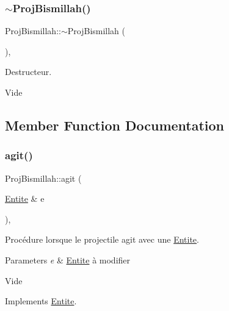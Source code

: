 \subsubsection{\texorpdfstring{$\sim$\+Proj\+Bismillah()}{~ProjBismillah()}}
{\footnotesize\ttfamily Proj\+Bismillah\+::$\sim$\+Proj\+Bismillah (\begin{DoxyParamCaption}{ }\end{DoxyParamCaption})\hspace{0.3cm}{\ttfamily [override]}, {\ttfamily [default]}}



Destructeur. 

Vide 

\subsection{Member Function Documentation}
\mbox{\label{class_proj_bismillah_a85f9cab1718a389d1e177806cb2c32c9}} 
\subsubsection{\texorpdfstring{agit()}{agit()}}
{\footnotesize\ttfamily Proj\+Bismillah\+::agit (\begin{DoxyParamCaption}\item[{\mbox{\hyperlink{class_entite}{Entite}} \&}]{e }\end{DoxyParamCaption})\hspace{0.3cm}{\ttfamily [override]}, {\ttfamily [virtual]}}



Procédure lorsque le projectile agit avec une \mbox{\hyperlink{class_entite}{Entite}}. 


\begin{DoxyParams}{Parameters}
{\em e} & \mbox{\hyperlink{class_entite}{Entite}} à modifier\\
\hline
\end{DoxyParams}
Vide 

Implements \mbox{\hyperlink{class_entite_a848ec47afac1d7ba970a2bcab5dc7b3b}{Entite}}.

\mbox{\label{class_proj_bismillah_a5a037871dddbe729c926e7d9eb69b026}} 
